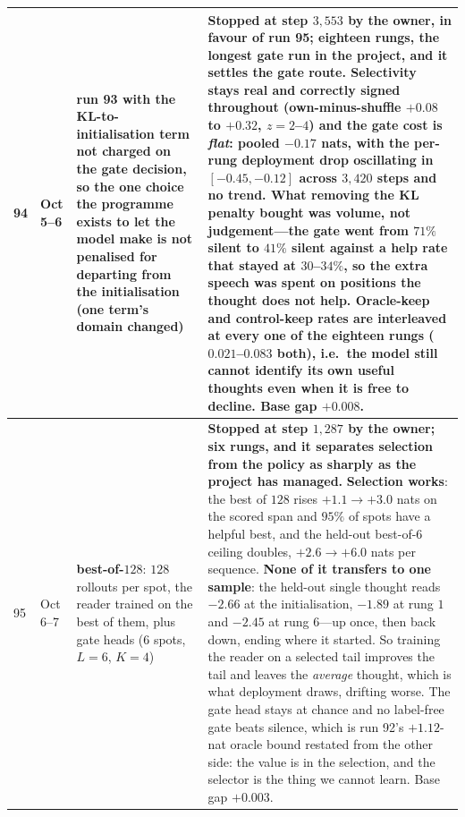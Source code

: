 \documentclass{article} %
\begin{document}
{\begin{longtable}{@{}llp{3.6cm}p{5.6cm}@{}}
\midrule
94 & Oct 5--6 & run 93 with the KL-to-initialisation term \textbf{not charged on the gate decision}, so the one choice the programme exists to let the model make is not penalised for departing from the initialisation (one term's domain changed) & \textbf{Stopped at step $3{,}553$ by the owner, in favour of run 95; eighteen rungs, the longest gate run in the project, and it settles the gate route.} Selectivity stays real and correctly signed throughout (own-minus-shuffle $+0.08$ to $+0.32$, $z = 2$--$4$) and the gate cost is \emph{flat}: pooled $-0.17$ nats, with the per-rung deployment drop oscillating in $[-0.45, -0.12]$ across $3{,}420$ steps and no trend. \textbf{What removing the KL penalty bought was volume, not judgement}---the gate went from $71\%$ silent to $41\%$ silent against a help rate that stayed at $30$--$34\%$, so the extra speech was spent on positions the thought does not help. Oracle-keep and control-keep rates are interleaved at every one of the eighteen rungs ($0.021$--$0.083$ both), i.e.\ the model still cannot identify its own useful thoughts even when it is free to decline. Base gap $+0.008$. \\
\midrule
95 & Oct 6--7 & \textbf{best-of-$128$}: $128$ rollouts per spot, the reader trained on the best of them, plus gate heads ($6$ spots, $L = 6$, $K = 4$) & \textbf{Stopped at step $1{,}287$ by the owner; six rungs, and it separates selection from the policy as sharply as the project has managed.} \textbf{Selection works}: the best of $128$ rises $+1.1 \to +3.0$ nats on the scored span and $95\%$ of spots have a helpful best, and the held-out best-of-$6$ ceiling doubles, $+2.6 \to +6.0$ nats per sequence. \textbf{None of it transfers to one sample}: the held-out single thought reads $-2.66$ at the initialisation, $-1.89$ at rung $1$ and $-2.45$ at rung $6$---up once, then back down, ending where it started. So training the reader on a selected tail improves the tail and leaves the \emph{average} thought, which is what deployment draws, drifting worse. The gate head stays at chance and no label-free gate beats silence, which is run 92's $+1.12$-nat oracle bound restated from the other side: the value is in the selection, and the selector is the thing we cannot learn. Base gap $+0.003$. \\
\midrule

\end{longtable}}
\end{document}
